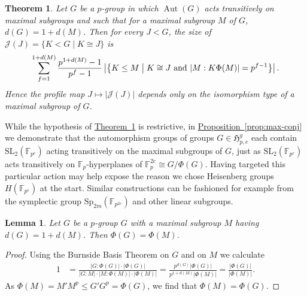 \documentclass[11pt]{article}
\numberwithin{equation}{section}
\theoremstyle{definition}
\theoremstyle{plain}
\newcommand{\expref}[2]{\hyperref[#2]{#1~\ref{#2}}}
\numberwithin{equation}{section}
\theoremstyle{plain}       %
\newtheorem{thm}[equation]{Theorem}
\newtheorem{lem}[equation]{Lemma}
\theoremstyle{remark}
\theoremstyle{definition}
\numberwithin{figure}{section}
\numberwithin{table}{section}
\newcommand{\mygroups}{\mathfrak{H}}
\newcommand{\bbF}{\mathbb{F}}  %
\DeclareMathOperator{\Aut}{Aut}  %
\begin{document}
\begin{thm}\label{thm:count}
	Let $G$ be a $p$-group in which $\Aut(G)$ acts transitively on maximal
	subgroups and such that for a maximal subgroup $M$ of $G$,\ $d(G)=1+d(M)$.
	Then for every $J<G$, the size of $\mathcal{J}(J)=\{ K< G \mid K\cong J\}$
	is
	\begin{align*}
		\sum_{f=1}^{1+d(M)} \frac{p^{1+d(M)}-1}{p^f-1} 
		\left|\left\{ K\leq M \;\middle|\;
			K\cong J\textnormal{ and }
			|M:K\Phi(M)|=p^{f-1}\right\}\right|.
	\end{align*}
	Hence the profile map $J\mapsto |\mathcal{J}(J)|$ depends only on the
	isomorphism type of a maximal subgroup of $G$.
\end{thm}

While the hypothesis of \expref{Theorem}{thm:count} is restrictive, in
\expref{Proposition}{prop:max-conj} we demonstrate that the automorphism groups of
groups $G\in \mygroups_{p,e}^{g}$ each contain $\mathrm{SL}_2(\bbF_{p^e})$
acting transitively on the maximal subgroups of $G$, just as
$\mathrm{SL}_2(\bbF_{p^e})$ acts transitively on $\bbF_p$-hyperplanes of
$\bbF_p^{2e}\cong G/\Phi(G)$.  Having targeted this particular action may help
expose the reason we chose Heisenberg groups $H(\bbF_{p^e})$ at the start.
%
%
%
Similar constructions can be fashioned for example from the symplectic group
$\mathrm{Sp}_{2m}(\mathbb{F}_{p^{2e}})$ and other linear subgroups.
%

\begin{lem}\label{lem:Frattini}
Let $G$ be a $p$-group $G$ with a maximal subgroup $M$ having $d(G)=1+d(M)$.
Then $\Phi(G)=\Phi(M)$.
\end{lem}
\begin{proof}
Using the Burnside Basis Theorem on $G$ and on $M$ we calculate 
\begin{align*}
	1 & = \frac{|G:\Phi(G)|\cdot |\Phi(G)|}{|G:M|\cdot |M:\Phi(M)|\cdot |\Phi(M)|}
		=\frac{p^{d(G)} |\Phi(G)|}{ p^{1+d(M)} |\Phi(M)|}
		=\frac{|\Phi(G)|}{|\Phi(M)|}.
\end{align*}
As $\Phi(M)=M' M^p\leq G' G^p=\Phi(G)$, we find that $\Phi(M)=\Phi(G)$.
\end{proof}
\end{document}
